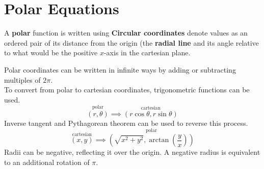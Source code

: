 \documentclass[../AP_Calculus]{subfiles}
\begin{document}
	\section{Polar Equations}
		A \textbf{polar} function is written using 
		\textbf{Circular coordinates} denote values as an ordered pair of its distance from the origin (the \textbf{radial line} and its angle relative to what would be the positive $x$-axis in the cartesian plane.
		\begin{center}
		\end{center}
		Polar coordinates can be written in infinite ways by adding or subtracting multiples of $2\pi$.\\
		To convert from polar to cartesian coordinates, trigonometric functions can be used.
		\[\overset{\text{polar}}{(r, \theta)} \implies \overset{\text{cartesian}}{(r\cos\theta, r\sin\theta)}\]
		Inverse tangent and Pythagorean theorem can be used to reverse this process.
		\[\overset{\text{cartesian}}{(x, y)} \implies \overset{\text{polar}}{\left(\sqrt{x^2 + y^2}, \arctan\left(\frac{y}{x}\right)\right)}\]
		Radii can be negative, reflecting it over the origin. A negative radius is equivalent to an additional rotation of $\pi$.
		\begin{center}
		\end{center}
\end{document}
